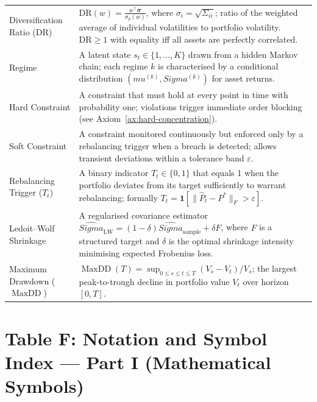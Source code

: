 \documentclass[12pt,openany]{book}
\newcommand{\bfw}{\mathbf{w}}
\newcommand{\bfmu}{\boldsymbol{\mu}}
\newcommand{\bfSigma}{\boldsymbol{\Sigma}}
\DeclareMathOperator{\MaxDD}{MaxDD}
\numberwithin{equation}{chapter}
\theoremstyle{plain}
\theoremstyle{definition}
\theoremstyle{remark}
\def\bfw{w}%
\def\bfmu{mu}%
\def\bfSigma{Sigma}%
\begin{document}
{\begin{longtable}{@{} p{4.2cm} >{\raggedright\arraybackslash}p{\dimexpr\linewidth-4.2cm-2\tabcolsep\relax} @{}}
\addlinespace
Diversification Ratio (DR) &
  $\mathrm{DR}(\bfw) = \frac{\bfw^\top\boldsymbol{\sigma}}{\sigma_p(\bfw)}$,
  where $\sigma_i = \sqrt{\Sigma_{ii}}$; ratio of the weighted average
  of individual volatilities to portfolio volatility.  $\mathrm{DR}
  \ge 1$ with equality iff all assets are perfectly correlated. \\
\addlinespace
Regime &
  A latent state $s_t \in \{1,\ldots,K\}$ drawn from a hidden Markov
  chain; each regime $k$ is characterised by a conditional distribution
  $(\bfmu^{(k)}, \bfSigma^{(k)})$ for asset returns. \\
\addlinespace
Hard Constraint &
  A constraint that must hold at every point in time with probability
  one; violations trigger immediate order blocking (see
  Axiom~\ref{ax:hard-concentration}). \\
\addlinespace
Soft Constraint &
  A constraint monitored continuously but enforced only by a
  rebalancing trigger when a breach is detected; allows transient
  deviations within a tolerance band $\varepsilon$. \\
\addlinespace
Rebalancing Trigger ($T_t$) &
  A binary indicator $T_t \in \{0,1\}$ that equals 1 when the
  portfolio deviates from its target sufficiently to warrant
  rebalancing; formally $T_t = \mathbf{1}[\|\hat{P}_t - P^*\|_F >
  \varepsilon]$. \\
\addlinespace
Ledoit--Wolf Shrinkage &
  A regularised covariance estimator
  $\hat{\bfSigma}_{\mathrm{LW}} = (1-\delta)\hat{\bfSigma}_{\mathrm{sample}}
  + \delta F$, where $F$ is a structured target and $\delta$ is the
  optimal shrinkage intensity minimising expected Frobenius loss. \\
\addlinespace
Maximum Drawdown ($\MaxDD$) &
  $\MaxDD(T) = \sup_{0 \le s \le t \le T}(V_s - V_t)/V_s$; the
  largest peak-to-trough decline in portfolio value $V_t$ over
  horizon $[0,T]$. \\
\hline
\end{longtable}
}

\clearpage
\chapter*{Table F: Notation and Symbol Index --- Part I (Mathematical Symbols)}
\end{document}
